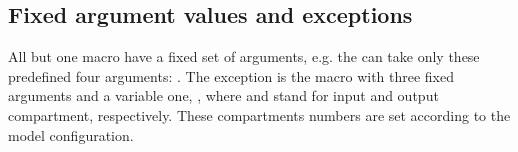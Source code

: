 %


\subsection{Fixed argument values and exceptions}
\label{subsec:fixedArguments}
All but one macro have a fixed set of arguments, e.g. the  can take only these predefined
four arguments: . The exception is the  macro with three fixed
arguments  and a variable one, , where  and
 stand for input and output compartment, respectively. These compartments numbers are set 
according to the model configuration. 

